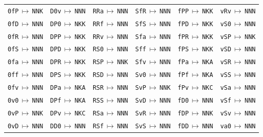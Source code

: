 {\begin{longtable}{@{}llllll@{}}
\texttt{0fP}\,$\mapsto$\,\texttt{NNK} & \texttt{D0v}\,$\mapsto$\,\texttt{NNN} & \texttt{RRa}\,$\mapsto$\,\texttt{NNN} & \texttt{SfR}\,$\mapsto$\,\texttt{NNN} & \texttt{fPP}\,$\mapsto$\,\texttt{NKK} & \texttt{vRv}\,$\mapsto$\,\texttt{NNN} \\
\texttt{0fD}\,$\mapsto$\,\texttt{NNN} & \texttt{DP0}\,$\mapsto$\,\texttt{NKK} & \texttt{RRf}\,$\mapsto$\,\texttt{NNN} & \texttt{SfS}\,$\mapsto$\,\texttt{NNN} & \texttt{fPD}\,$\mapsto$\,\texttt{NKK} & \texttt{vS0}\,$\mapsto$\,\texttt{NNN} \\
\texttt{0fR}\,$\mapsto$\,\texttt{NNN} & \texttt{DPP}\,$\mapsto$\,\texttt{NKK} & \texttt{RRv}\,$\mapsto$\,\texttt{NNN} & \texttt{Sfa}\,$\mapsto$\,\texttt{NNN} & \texttt{fPR}\,$\mapsto$\,\texttt{NKK} & \texttt{vSP}\,$\mapsto$\,\texttt{NNK} \\
\texttt{0fS}\,$\mapsto$\,\texttt{NNN} & \texttt{DPD}\,$\mapsto$\,\texttt{NKK} & \texttt{RS0}\,$\mapsto$\,\texttt{NNN} & \texttt{Sff}\,$\mapsto$\,\texttt{NNN} & \texttt{fPS}\,$\mapsto$\,\texttt{NKK} & \texttt{vSD}\,$\mapsto$\,\texttt{NNN} \\
\texttt{0fa}\,$\mapsto$\,\texttt{NNN} & \texttt{DPR}\,$\mapsto$\,\texttt{NKK} & \texttt{RSP}\,$\mapsto$\,\texttt{NNK} & \texttt{Sfv}\,$\mapsto$\,\texttt{NNN} & \texttt{fPa}\,$\mapsto$\,\texttt{NKA} & \texttt{vSR}\,$\mapsto$\,\texttt{NNN} \\
\texttt{0ff}\,$\mapsto$\,\texttt{NNN} & \texttt{DPS}\,$\mapsto$\,\texttt{NKK} & \texttt{RSD}\,$\mapsto$\,\texttt{NNN} & \texttt{Sv0}\,$\mapsto$\,\texttt{NNN} & \texttt{fPf}\,$\mapsto$\,\texttt{NKA} & \texttt{vSS}\,$\mapsto$\,\texttt{NNN} \\
\texttt{0fv}\,$\mapsto$\,\texttt{NNN} & \texttt{DPa}\,$\mapsto$\,\texttt{NKA} & \texttt{RSR}\,$\mapsto$\,\texttt{NNN} & \texttt{SvP}\,$\mapsto$\,\texttt{NNK} & \texttt{fPv}\,$\mapsto$\,\texttt{NKC} & \texttt{vSa}\,$\mapsto$\,\texttt{NNN} \\
\texttt{0v0}\,$\mapsto$\,\texttt{NNN} & \texttt{DPf}\,$\mapsto$\,\texttt{NKA} & \texttt{RSS}\,$\mapsto$\,\texttt{NNN} & \texttt{SvD}\,$\mapsto$\,\texttt{NNN} & \texttt{fD0}\,$\mapsto$\,\texttt{NNN} & \texttt{vSf}\,$\mapsto$\,\texttt{NNN} \\
\texttt{0vP}\,$\mapsto$\,\texttt{NNK} & \texttt{DPv}\,$\mapsto$\,\texttt{NKC} & \texttt{RSa}\,$\mapsto$\,\texttt{NNN} & \texttt{SvR}\,$\mapsto$\,\texttt{NNN} & \texttt{fDP}\,$\mapsto$\,\texttt{NNK} & \texttt{vSv}\,$\mapsto$\,\texttt{NNN} \\
\texttt{0vD}\,$\mapsto$\,\texttt{NNN} & \texttt{DD0}\,$\mapsto$\,\texttt{NNN} & \texttt{RSf}\,$\mapsto$\,\texttt{NNN} & \texttt{SvS}\,$\mapsto$\,\texttt{NNN} & \texttt{fDD}\,$\mapsto$\,\texttt{NNN} & \texttt{va0}\,$\mapsto$\,\texttt{NNN} \\

\end{longtable}}
